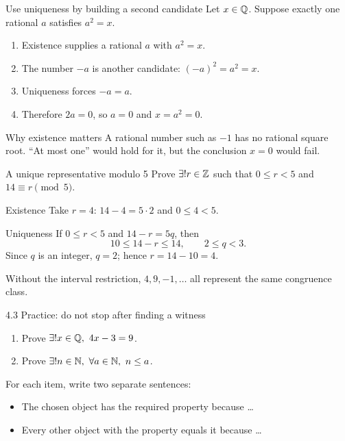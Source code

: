 \begin{frame}{Use uniqueness by building a second candidate}
Let $x\in\mathbb{Q}$. Suppose exactly one rational $a$ satisfies $a^2=x$.
\begin{enumerate}
\item Existence supplies a rational $a$ with $a^2=x$.
\item The number $-a$ is another candidate: $(-a)^2=a^2=x$.
\item Uniqueness forces $-a=a$.
\item Therefore $2a=0$, so $a=0$ and $x=a^2=0$.
\end{enumerate}
\begin{block}{Why existence matters}
A rational number such as $-1$ has no rational square root. ``At most one'' would hold for it, but the conclusion $x=0$ would fail.
\end{block}
\end{frame}

\begin{frame}{A unique representative modulo 5}
Prove $\exists!r\in\mathbb{Z}$ such that $0\le r<5$ and $14\equiv r\pmod5$.
\begin{block}{Existence}
Take $r=4$: $14-4=5\cdot2$ and $0\le4<5$.
\end{block}
\begin{block}{Uniqueness}
If $0\le r<5$ and $14-r=5q$, then
\[
10\le14-r\le14,\qquad 2\le q<3.
\]
Since $q$ is an integer, $q=2$; hence $r=14-10=4$.
\end{block}
Without the interval restriction, $4,9,-1,\ldots$ all represent the same congruence class.
\end{frame}

\begin{frame}{4.3 Practice: do not stop after finding a witness}
\begin{enumerate}
\item Prove $\exists!x\in\Q,\ 4x-3=9$.
\item Prove $\exists!n\in\mathbb{N},\ \forall a\in\mathbb{N},\ n\le a$.
\end{enumerate}
For each item, write two separate sentences:
\begin{itemize}
\item The chosen object has the required property because \ldots
\item Every other object with the property equals it because \ldots
\end{itemize}
\end{frame}

